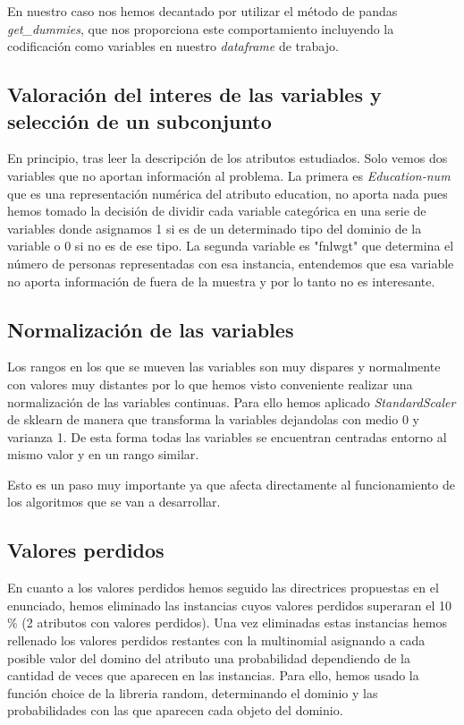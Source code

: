 \documentclass[11pt]{article}
\begin{document}
En nuestro caso nos hemos decantado por utilizar el método de pandas
\textit{get\_dummies}, que nos proporciona este comportamiento incluyendo la
codificación como variables en nuestro \textit{dataframe} de trabajo.

\subsection{Valoración del interes de las variables y selección de un subconjunto}

En principio, tras leer la descripción de los atributos estudiados. Solo vemos
dos variables que no aportan información al problema. La primera es
\textit{Education-num} que es una representación numérica del atributo education, no
aporta nada pues hemos tomado la decisión de dividir cada variable categórica en
una serie de variables donde asignamos 1 si es de un determinado tipo del
dominio de la variable o 0 si no es de ese tipo. La segunda variable es "fnlwgt"
que determina el número de personas representadas con esa instancia, entendemos
que esa variable no aporta información de fuera de la muestra y por lo tanto no
es interesante.

\subsection{Normalización de las variables}

Los rangos en los que se mueven las variables son muy dispares y normalmente con
valores muy distantes por lo que hemos visto conveniente realizar una
normalización de las variables continuas. Para ello hemos aplicado
\textit{StandardScaler} de sklearn de manera que transforma la variables
dejandolas con medio 0 y varianza 1. De esta forma  todas las variables se
encuentran centradas entorno al mismo valor y en un rango similar. 

Esto es un paso muy importante ya que afecta directamente al funcionamiento 
de los algoritmos que se van a desarrollar.

\subsection{Valores perdidos}

En cuanto a los valores perdidos hemos seguido las directrices propuestas en el
enunciado, hemos eliminado las instancias cuyos valores perdidos superaran el
10$\%$ (2 atributos con valores perdidos). Una vez eliminadas estas instancias
hemos rellenado los valores perdidos restantes con la multinomial asignando a
cada posible valor del domino del atributo una probabilidad dependiendo de la
cantidad de veces que aparecen en las instancias. Para ello, hemos usado la
función choice de la libreria random, determinando el dominio y las
probabilidades con las que aparecen cada objeto del dominio.
\end{document}
